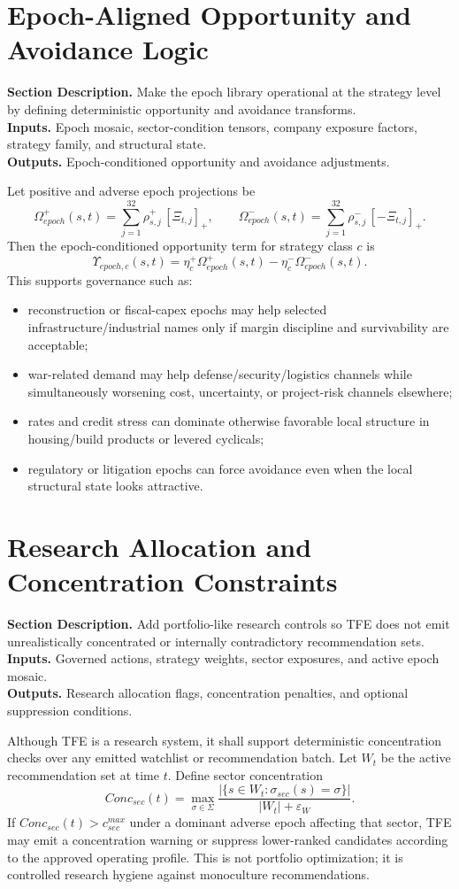 \documentclass[11pt]{report}
\newcommand{\meta}[3]{\textbf{Section Description.} #1\\
\textbf{Inputs.} #2\\
\textbf{Outputs.} #3\par}
\begin{document}
\section{Epoch-Aligned Opportunity and Avoidance Logic}
\meta{Make the epoch library operational at the strategy level by defining deterministic opportunity and avoidance transforms.}{Epoch mosaic, sector-condition tensors, company exposure factors, strategy family, and structural state.}{Epoch-conditioned opportunity and avoidance adjustments.}

Let positive and adverse epoch projections be
\[
\Omega_{epoch}^{+}(s,t)=\sum_{j=1}^{32} \rho^{+}_{s,j}\,[\Xi_{t,j}]_{+},
\qquad
\Omega_{epoch}^{-}(s,t)=\sum_{j=1}^{32} \rho^{-}_{s,j}\,[-\Xi_{t,j}]_{+}.
\]
Then the epoch-conditioned opportunity term for strategy class $c$ is
\[
\Upsilon_{epoch,c}(s,t)=\eta_c^{+}\Omega_{epoch}^{+}(s,t)-\eta_c^{-}\Omega_{epoch}^{-}(s,t).
\]
This supports governance such as:
\begin{itemize}
    \item reconstruction or fiscal-capex epochs may help selected infrastructure/industrial names only if margin discipline and survivability are acceptable;
    \item war-related demand may help defense/security/logistics channels while simultaneously worsening cost, uncertainty, or project-risk channels elsewhere;
    \item rates and credit stress can dominate otherwise favorable local structure in housing/build products or levered cyclicals;
    \item regulatory or litigation epochs can force avoidance even when the local structural state looks attractive.
\end{itemize}

\section{Research Allocation and Concentration Constraints}
\meta{Add portfolio-like research controls so TFE does not emit unrealistically concentrated or internally contradictory recommendation sets.}{Governed actions, strategy weights, sector exposures, and active epoch mosaic.}{Research allocation flags, concentration penalties, and optional suppression conditions.}

Although TFE is a research system, it shall support deterministic concentration checks over any emitted watchlist or recommendation batch. Let $W_t$ be the active recommendation set at time $t$. Define sector concentration
\[
Conc_{sec}(t)=\max_{\sigma\in\Sigma}\frac{|\{s\in W_t:\sigma_{sec}(s)=\sigma\}|}{|W_t|+\varepsilon_W}.
\]
If $Conc_{sec}(t)>c_{sec}^{max}$ under a dominant adverse epoch affecting that sector, TFE may emit a concentration warning or suppress lower-ranked candidates according to the approved operating profile. This is not portfolio optimization; it is controlled research hygiene against monoculture recommendations.
\end{document}

